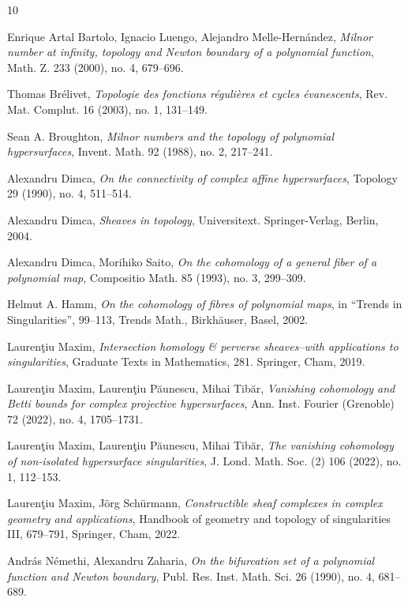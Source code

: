 \documentclass[12pt,leqno,twoside]{amsart}
\theoremstyle{remark}
\theoremstyle{remark}
\theoremstyle{definition}
\theoremstyle{remark}
\theoremstyle{remark}
\theoremstyle{remark}
\numberwithin{equation}{section}  %
\begin{document}
\begin{thebibliography}{10}

 Enrique Artal Bartolo, Ignacio Luengo, Alejandro Melle-Hern\'andez, {\it Milnor number at infinity, topology and Newton boundary of a polynomial function}, Math. Z. 233 (2000), no. 4, 679--696.

  Thomas Br\'elivet, {\it Topologie des fonctions r\'eguli\`eres et cycles \'evanescents}, Rev. Mat. Complut. 16 (2003), no. 1, 131--149.

 Sean A. Broughton, 
{\it Milnor numbers and the topology of polynomial hypersurfaces}, 
Invent. Math. 92 (1988), no. 2, 217--241.

  Alexandru Dimca,  {\it 
On the connectivity of complex affine hypersurfaces}, 
Topology 29 (1990), no. 4, 511--514.

  Alexandru Dimca,  {\it Sheaves in topology}, Universitext. Springer-Verlag, Berlin, 2004.

 Alexandru Dimca, Morihiko Saito, 
{\it On the cohomology of a general fiber of a polynomial map}, 
Compositio Math. 85 (1993), no. 3, 299--309.

  Helmut A. Hamm, {\it On the cohomology of fibres of polynomial maps}, in ``Trends in Singularities'', 99--113, Trends Math., Birkh\"auser, Basel, 2002.

 Lauren\c{t}iu Maxim, {\it Intersection homology \& perverse sheaves--with applications to singularities}, Graduate Texts in Mathematics, 281. Springer, Cham, 2019.

 Lauren\c{t}iu Maxim, Lauren\c{t}iu Păunescu, Mihai Tib\u{a}r, {\it Vanishing cohomology and Betti bounds for complex projective hypersurfaces}, Ann. Inst. Fourier (Grenoble) 72 (2022), no. 4, 1705--1731.

 Lauren\c{t}iu Maxim, Lauren\c{t}iu Păunescu, Mihai Tib\u{a}r, {\it The vanishing cohomology of non-isolated hypersurface singularities}, J. Lond. Math. Soc. (2) 106 (2022), no. 1, 112--153.

 Lauren\c{t}iu Maxim,  J\"org Sch\"urmann, {\it Constructible sheaf complexes in complex geometry and applications}, Handbook of geometry and topology of singularities III, 679--791, Springer, Cham, 2022.

 Andr\'as N\'emethi, Alexandru Zaharia, 
{\it On the bifurcation set of a polynomial function and Newton boundary}, 
Publ. Res. Inst. Math. Sci. 26 (1990), no. 4, 681--689.


\end{thebibliography}
\end{document}

